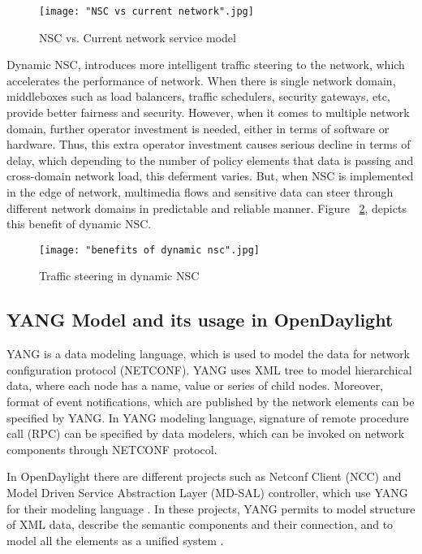 \begin{figure}[h!]
\centering
{}
\texttt{[image: "NSC vs current network".jpg]}
\caption{NSC vs. Current network service model \cite{Wol13}}
\label{fig:NSC}
\end{figure}

Dynamic NSC, introduces more intelligent traffic steering to the network, which accelerates the performance of network. When there is single network domain, middleboxes such as load balancers, traffic schedulers, security gateways, etc, provide better fairness and  security. However, when it comes to multiple network domain, further operator investment is needed, either in terms of software or hardware. Thus, this extra operator investment causes serious decline in terms of delay, which depending to the number of policy elements that data is passing and cross-domain network load, this deferment varies. But, when NSC is implemented in the edge of network, multimedia flows and sensitive data can steer through different network domains in predictable and reliable manner. Figure ~\ref{fig:NSCbenefit}, depicts this benefit of dynamic NSC. 


\begin{figure}[h!]
\centering
{}
\texttt{[image: "benefits of dynamic nsc".jpg]}
\caption{Traffic steering in dynamic NSC \cite{Wol13}}
\label{fig:NSCbenefit}
\end{figure}

\subsection{YANG Model and its usage in OpenDaylight}

YANG is a data modeling language, which is used to model the data for network configuration protocol (NETCONF). YANG uses XML tree to model hierarchical data, where each node has a name, value or series of child nodes. Moreover, format of event notifications, which are published by the network elements can be specified by YANG. In YANG modeling language, signature of remote procedure call (RPC) can be specified by data modelers, which can be invoked on network components through NETCONF protocol. \cite{Bjo10}

In OpenDaylight there are different projects such as Netconf Client (NCC) and Model Driven Service Abstraction Layer (MD-SAL) controller, which use YANG for their modeling language \cite{MDS} \cite{Netconf}. In these projects, YANG permits to model structure of XML data, describe the semantic components and their connection, and to model all the elements as a unified system \cite{MDS}.

